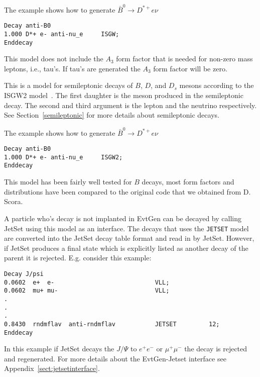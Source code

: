 \Example
The example shows how to generate $\bar B^0\rightarrow D^{*+}e\nu$
\begin{verbatim}
Decay anti-B0
1.000 D*+ e- anti-nu_e     ISGW;
Enddecay
\end{verbatim}

\Notes
This model does not include the $A_3$ form factor that is 
needed for non-zero mass leptons, i.e., tau's. If tau's
are generated the $A_3$ form factor will be zero.





\label{isgw2}



\Expl
This is a model for semileptonic decays of $B$, $D$, and $D_s$ mesons 
according to the ISGW2 model~\cite{Scora95}. The first daughter
is the meson produced in the semileptonic decay. The second and third
argument is the lepton and the neutrino respectively.
See Section~\ref{semileptonic} for more details about semileptonic
decays.

\Example
The example shows how to generate $\bar B^0\rightarrow D^{*+}e\nu$
\begin{verbatim}
Decay anti-B0
1.000 D*+ e- anti-nu_e     ISGW2;
Enddecay
\end{verbatim}

\Notes
This model has been fairly well tested for $B$ decays, most form
factors and distributions have been compared to the original 
code that we obtained from D. Scora.



\label{jetset}



\Expl
A particle who's decay is not implanted in EvtGen
can be decayed by calling JetSet using this model as an interface.
The decays that uses the {\tt JETSET} model are converted
into the JetSet decay table format and read in by JetSet.
However, if JetSet produces a final state which
is explicitly listed as another decay of the parent it
is rejected. E.g. consider this example:
\begin{verbatim}
Decay J/psi
0.0602  e+  e-                            VLL;
0.0602  mu+ mu-                           VLL;
.
.
.
0.8430  rndmflav  anti-rndmflav           JETSET         12;
Enddecay
\end{verbatim}
In this example if JetSet decays the $J/\Psi$ to $e^+e^-$
or $\mu^+\mu^-$ the decay is rejected and regenerated.
For more details about the EvtGen-Jetset interface see
Appendix~\ref{sect:jetsetinterface}.


